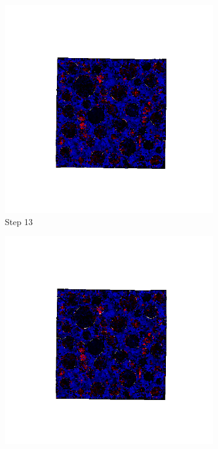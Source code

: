 \begin{figure}[ht!]
      \begin{subfigure}{.25\textwidth}
        \centering
        \includegraphics[width=1.0\linewidth]{Files//A30P75_3_IS/DEP50-STEP(013).png}
      \caption{Step 13}
      \end{subfigure}%
      \begin{subfigure}{.25\textwidth}
        \centering
        \includegraphics[width=1.0\linewidth]{Files/A30P75_3_IS/DEP50-STEP(014).png}

\end{subfigure}
\end{figure}
